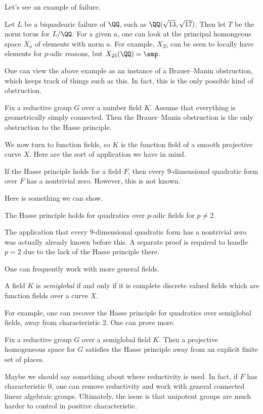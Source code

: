 \documentclass{article}
\begin{document}
Let's see an example of failure.
\begin{example}
	Let $L$ be a biquadearic failure of $\QQ$, such as $\QQ(\sqrt{13},\sqrt{17})$. Then let $T$ be the norm torus for $L/\QQ$. For a given $a$, one can look at the principal homongeous space $X_a$ of elements with norm $a$. For example, $X_{25}$ can be seen to locally have elements for $p$-adic reasons, but $X_{25}(\QQ)=\emp$.
\end{example}
One can view the above example as an instance of a Brauer--Manin obstruction, which keeps track of things such as this. In fact, this is the only possible kind of obstruction.
\begin{theorem}[Borovoi]
	Fix a reductive group $G$ over a number field $K$. Assume that everything is geometrically simply connected. Then the Brauer--Manin obstruction is the only obstruction to the Hasse principle.
\end{theorem}
We now turn to function fields, so $K$ is the function field of a smooth projective curve $X$. Here are the sort of application we have in mind.
\begin{example}
	If the Hasse principle holds for a field $F$, then every $9$-dimensional quadratic form over $F$ has a nontrivial zero. However, this is not known.
\end{example}
Here is something we can show.
\begin{theorem}
	The Hasse principle holds for quadratics over $p$-adic fields for $p\ne2$.
\end{theorem}
\begin{remark}
	The application that every $9$-dimensional quadratic form has a nontrivial zero was actually already known before this. A separate proof is required to handle $p=2$ due to the lack of the Hasse principle there.
\end{remark}
One can frequently work with more general fields.
\begin{definition}[semiglobal]
	A field $K$ is \textit{semiglobal} if and only if it is complete discrete valued fields which are function fields over a curve $X$.
\end{definition}
For example, one can recover the Hasse principle for quadratics over semiglobal fields, away from characteristic $2$. One can prove more.
\begin{theorem}
	Fix a reductive group $G$ over a semiglobal field $K$. Then a projective homogeneous space for $G$ satisfies the Hasse principle away from an explicit finite set of places.
\end{theorem}
\begin{remark}
	Maybe we should say something about where reductivity is used. In fact, if $F$ has characteristic $0$, one can remove reductivity and work with general connected linear algebraic groups. Ultimately, the issue is that unipotent groups are much harder to control in positive characteristic.
\end{remark}
\end{document}

